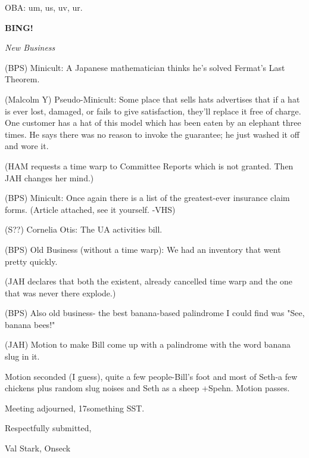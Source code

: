 \documentclass[12pt]{article}
\newcommand{\bing}{{\bf BING!} }
\newcommand{\goto}[1]{\bing \vskip 12pt \centerline{{\em{#1}}}}
\begin{document}
OBA: um, us, uv, ur.

\goto{New Business}

(BPS) Minicult: A Japanese mathematician thinks he's solved Fermat's Last Theorem.

(Malcolm Y) Pseudo-Minicult: Some place that sells hats advertises that if a hat is ever lost, damaged, or fails to give satisfaction, they'll replace it free of charge. One customer has a hat of this model which has been eaten by an elephant three times. He says there was no reason to invoke the guarantee; he just washed it off and wore it.

(HAM requests a time warp to Committee Reports which is not granted. Then JAH changes her mind.)

(BPS) Minicult: Once again there is a list of the greatest-ever insurance claim forms. (Article attached, see it yourself. -VHS)

(S??) Cornelia Otis: The UA activities bill.

(BPS) Old Business (without a time warp): We had an inventory that went pretty quickly.

(JAH declares that both the existent, already cancelled time warp and the one that was never there explode.)

(BPS) Also old business- the best banana-based palindrome I could find was "See, banana bees!"

(JAH) Motion to make Bill come up with a palindrome with the word banana slug in it.

Motion seconded (I guess), quite a few people-Bill's foot and most of Seth-a few chickens plus random slug noises and Seth as a sheep +Spehn. Motion passes.

\vspace{12pt}

\noindent
Meeting adjourned, 17something SST.

\vspace{18pt}

\centerline{Respectfully submitted,}
\centerline{Val Stark, Onseck}
\end{document}
